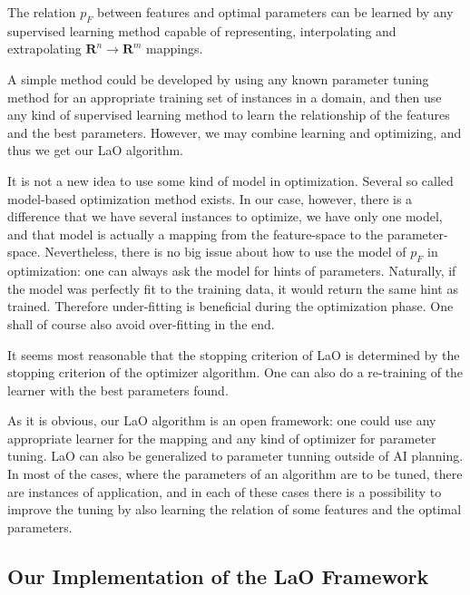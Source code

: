 \documentclass{acm_proc_article-sp}
\begin{document}
The relation \begin{math} p_F \end{math} between features and optimal parameters can be learned by any supervised learning method capable of representing, interpolating and extrapolating  \begin{math}\mathbf{R}^n\to \mathbf{R}^m \end{math} mappings. 

A simple method could be developed by using any known parameter tuning method for an appropriate training set of instances in a domain, and then use any kind of supervised learning method to learn the relationship of the features and the best parameters. However, we may combine learning and optimizing, and thus we get our LaO algorithm.

It is not a new idea to use some kind of model in optimization. Several so called model-based optimization method exists. In our case, however, there is a difference that we have several instances to optimize, we have only one model, and that model is actually a mapping from the feature-space to the parameter-space. Nevertheless, there is no big issue about how to use the model of \begin{math}p_F\end{math} in optimization: one can always ask the model for hints of parameters. Naturally, if the model was perfectly fit to the training data, it would return the same hint as trained. Therefore under-fitting is beneficial during the optimization phase. One shall of course also avoid over-fitting in the end.

It seems most reasonable that the stopping criterion of LaO is determined by the stopping criterion of the optimizer algorithm. One can also do a re-training of the learner with the best parameters found.

As it is obvious, our LaO algorithm is an open framework: one could use any appropriate learner for the mapping and any kind of optimizer for parameter tuning. LaO can also be generalized to parameter tunning outside of AI planning. In most of the cases, where the parameters of an algorithm are to be tuned, there are instances of application, and in each of these cases there is a possibility to improve the tuning by also learning the relation of some features and the optimal parameters.

\subsection{Our Implementation of the LaO Framework}
\end{document}
